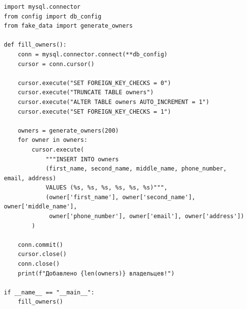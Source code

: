 \documentclass[a4paper]{article}
\begin{document}
\begin{lstlisting}[caption = Заполнение таблицы Owners, basicstyle= \scriptsize \ttfamily]
import mysql.connector
from config import db_config
from fake_data import generate_owners

def fill_owners():
    conn = mysql.connector.connect(**db_config)
    cursor = conn.cursor()

    cursor.execute("SET FOREIGN_KEY_CHECKS = 0")
    cursor.execute("TRUNCATE TABLE owners")
    cursor.execute("ALTER TABLE owners AUTO_INCREMENT = 1")
    cursor.execute("SET FOREIGN_KEY_CHECKS = 1")
    
    owners = generate_owners(200)
    for owner in owners:
        cursor.execute(
            """INSERT INTO owners 
            (first_name, second_name, middle_name, phone_number, email, address)
            VALUES (%s, %s, %s, %s, %s, %s)""",
            (owner['first_name'], owner['second_name'], owner['middle_name'],
             owner['phone_number'], owner['email'], owner['address'])
        )
    
    conn.commit()
    cursor.close()
    conn.close()
    print(f"Добавлено {len(owners)} владельцев!")

if __name__ == "__main__":
    fill_owners()
\end{lstlisting}
\end{document}
